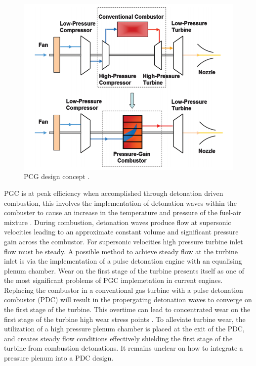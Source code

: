 \begin{figure}[H] 
 \centering
 \includegraphics[scale=0.5]{pcg.png} 
 \caption{PCG design concept \cite{akbari2009review}.}
 \label{fig:pcg}
\end{figure}

PGC is at peak efficiency when accomplished through detonation driven combustion, this involves the implementation of detonation waves within the combuster to cause an increase in the temperature and pressure of the fuel-air mixture \cite{eidelman1991review}. During combustion, detonation waves produce flow at supersonic velocities leading to an approximate constant volume and significant pressure gain across the combustor. For supersonic velocities high pressure turbine inlet flow must be steady. A possible method to achieve steady flow at the turbine inlet is via the implementation of a pulse detonation engine \cite{kailasanath2009research} with an equalising plenum chamber. Wear on the first stage of the turbine presents itself as one of the most significant problems of PGC implemetation in current engines. Replacing the combustor in a conventional gas turbine with a pulse detonation combustor (PDC) will result in the propergating detonation waves to converge on the first stage of the turbine. This overtime can lead to concentrated wear on the first stage of the turbine high wear stress points \cite{dean2005operation}. To alleviate turbine wear, the utilization of a high pressure plenum chamber is placed at the exit of the PDC, and creates steady flow conditions effectively shielding the first stage of the turbine from combustion detonations. It remains unclear on how to integrate a pressure plenum into a PDC design. 

